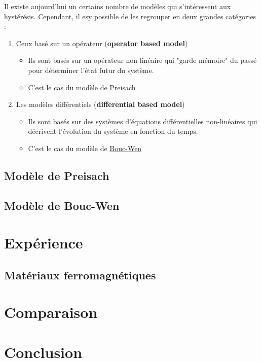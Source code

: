 \documentclass[11pt]{article}
\begin{document}
Il existe aujourd'hui un certains nombre de modèles qui s'intéressent aux hystérésis. Cependant, il esy possible
de les regrouper en deux grandes catégories :
\begin{enumerate}
    \item Ceux basé sur un opérateur (\textbf{operator based model})
    \begin{itemize}
        \item Ils sont basés sur un opérateur non linéaire qui "garde mémoire" du passé pour déterminer l'état futur du système.
        \item C'est le cas du modèle de \underline{Preisach}
    \end{itemize}
    \item Les modèles différentiels (\textbf{differential based model})
    \begin{itemize}
        \item Ils sont basés sur des systèmes d'équations différentielles non-linéaires qui décrivent l'évolution du système en fonction du temps.
        \item C'est le cas du modèle de \underline{Bouc-Wen}
    \end{itemize}
\end{enumerate}


\subsection{Modèle de Preisach}
\subsection{Modèle de Bouc-Wen}

\section{Expérience}
\subsection{Matériaux ferromagnétiques}

\section{Comparaison}

\section{Conclusion}
\end{document}
